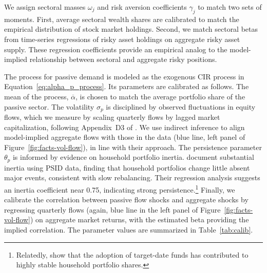 \documentclass[12pt,english]{article}
\begin{document}

We assign sectoral masses $\omega_j$ and risk aversion coefficients $\gamma_j$ to match two sets of moments. First, average sectoral wealth shares are calibrated to match the empirical distribution of stock market holdings. Second, we match sectoral betas from time-series regressions of risky asset holdings on aggregate risky asset supply. These regression coefficients provide an empirical analog to the model-implied relationship between sectoral and aggregate risky positions.  


The process for passive demand is modeled as the exogenous CIR process in Equation~\eqref{eq:alpha_p_process}. Its parameters are calibrated as follows. The mean of the process, $\overline{\alpha}$, is chosen to match the average portfolio share of the passive sector. The volatility $\sigma_p$ is disciplined by observed fluctuations in equity flows, which we measure by scaling quarterly flows by lagged market capitalization, following Appendix~D3 of \citet{gabaix2020search}. We use indirect inference to align model-implied aggregate flows with those in the data (blue line, left panel of Figure~\ref{fig:facts-vol-flow}), in line with their approach. The persistence parameter $\theta_p$ is informed by evidence on household portfolio inertia. \citet{brunnermeier2008wealth} document substantial inertia using PSID data, finding that household portfolios change little absent major events, consistent with slow rebalancing. Their regression analysis suggests an inertia coefficient near 0.75, indicating strong persistence.\footnote{Relatedly, \citet{parker2023retail} show that the adoption of target-date funds has contributed to highly stable household portfolio shares.} Finally, we calibrate the correlation between passive flow shocks and aggregate shocks by regressing quarterly flows (again, blue line in the left panel of Figure~\ref{fig:facts-vol-flow}) on aggregate market returns, with the estimated beta providing the implied correlation. The parameter values are summarized in Table~\ref{tab:calib}.  
\end{document}
